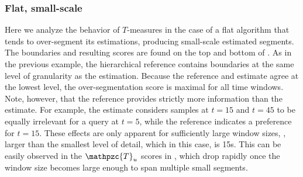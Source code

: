 \documentclass{article}
\def\shag{\ensuremath{\mathpzc{T}}}
\begin{document}
\subsubsection{Flat, small-scale}

Here we analyze the behavior of $T$-measures in the case of a flat algorithm that tends to over-segment its estimations, producing small-scale estimated segments.
The boundaries and resulting scores are found on the top and bottom of .
As in the previous example, the hierarchical reference contains boundaries at the same level of granularity as the estimation. 
Because the reference and estimate agree at the lowest level, the over-segmentation score is maximal for all time windows.
Note, however, that the reference provides strictly more information than the estimate.  For example, the estimate considers samples at $t=15$ and $t=45$ to be equally irrelevant for a 
query at $t=5$, while the reference indicates a preference for $t=15$.  These effects are only apparent for sufficiently large window sizes, \eg, larger than the smallest level of
detail, which in this case, is 15s.  This can be easily observed in the $\shag_u$
scores in , which drop rapidly once the window size becomes
large enough to span multiple small segments.
\end{document}
